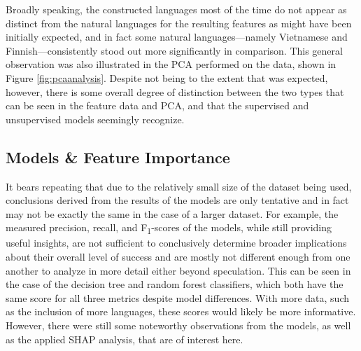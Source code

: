 \documentclass[12pt,a4paper]{article}
\numberwithin{figure}{section}
\numberwithin{table}{section}
\numberwithin{definition}{section}
\begin{document}
Broadly speaking, the constructed languages most of the time do not appear as distinct from the natural languages for the resulting features as might have been initially expected, and in fact some natural languages---namely Vietnamese and Finnish---consistently stood out more significantly in comparison. This general observation was also illustrated in the PCA performed on the data, shown in Figure \ref{fig:pcaanalysis}. Despite not being to the extent that was expected, however, there is some overall degree of distinction between the two types that can be seen in the feature data and PCA, and that the supervised and unsupervised models seemingly recognize. 







\subsection{Models \& Feature Importance}
\label{ssec:modelsandfeatureimportance}

It bears repeating that due to the relatively small size of the dataset being used, conclusions derived from the results of the models are only tentative and in fact may not be exactly the same in the case of a larger dataset. For example, the measured precision, recall, and F\textsubscript{1}-scores of the models, while still providing useful insights, are not sufficient to conclusively determine broader implications about their overall level of success and are mostly not different enough from one another to analyze in more detail either beyond speculation. This can be seen in the case of the decision tree and random forest classifiers, which both have the same score for all three metrics despite model differences. With more data, such as the inclusion of more languages, these scores would likely be more informative. However, there were still some noteworthy observations from the models, as well as the applied SHAP analysis, that are of interest here.
\end{document}
